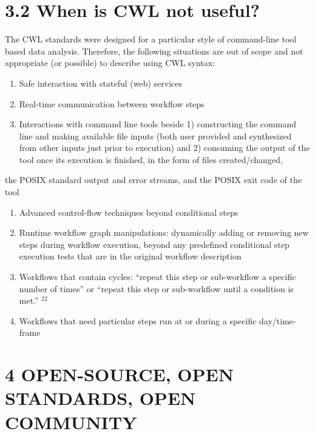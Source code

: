 \documentclass[
]{article}
\providecommand{\tightlist}{%
  \setlength{\itemsep}{0pt}\setlength{\parskip}{0pt}}
\begin{document}
\section{3.2 When is CWL not useful?}\label{when-is-cwl-not-useful}

The CWL standards were designed for a particular style of command-line
tool based data analysis. Therefore, the following situations are out of
scope and not appropriate (or possible) to describe using CWL syntax:

\begin{enumerate}
\def\labelenumi{(\arabic{enumi})}
\tightlist
\item
  Safe interaction with stateful (web) services\\
\item
  Real-time communication between workflow steps\\
\item
  Interactions with command line tools beside 1) constructing the
  command line and making available file inputs (both user provided and
  synthesized from other inputs just prior to execution) and 2)
  consuming the output of the tool once its execution is finished, in
  the form of files created/changed,
\end{enumerate}

the POSIX standard output and error streams, and the POSIX exit code of
the tool

\begin{enumerate}
\def\labelenumi{(\arabic{enumi})}
\setcounter{enumi}{3}
\tightlist
\item
  Advanced control-flow techniques beyond conditional steps\\
\item
  Runtime workflow graph manipulations: dynamically adding or removing
  new steps during workflow execution, beyond any predefined conditional
  step execution tests that are in the original workflow description\\
\item
  Workflows that contain cycles: ``repeat this step or sub-workflow a
  specific number of times'' or ``repeat this step or sub-workflow until
  a condition is met.'' \(^{22}\)\\
\item
  Workflows that need particular steps run at or during a specific
  day/time-frame
\end{enumerate}

\section{4 OPEN-SOURCE, OPEN STANDARDS, OPEN
COMMUNITY}\label{open-source-open-standards-open-community}
\end{document}
